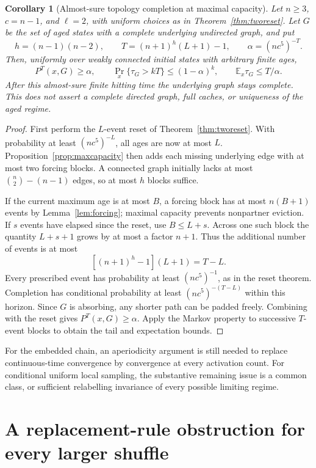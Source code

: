 \documentclass[11pt]{article}
\newtheorem{corollary}[theorem]{Corollary}
\begin{document}
\begin{corollary}[Almost-sure topology completion at maximal capacity]
\label{cor:twocomplete}
Let $n\ge3$, $c=n-1$, and $\ell=2$, with uniform choices as
in Theorem~\ref{thm:tworeset}. Let $G$ be the set of aged
states with a complete underlying undirected graph, and put
\[
 h=(n-1)(n-2),\qquad
 T=(n+1)^h(L+1)-1,\qquad
 \alpha=(nc^5)^{-T}.
\]
Then, uniformly over weakly connected initial states with
arbitrary finite ages,
\[
 P^T(x,G)\ge\alpha,\qquad
 \Pr_x\{\tau_G>kT\}\le(1-\alpha)^k,\qquad
 \mathbb E_x\tau_G\le T/\alpha.
\]
After this almost-sure finite hitting time the underlying
graph stays complete. This does not assert a complete
directed graph, full caches, or uniqueness of the aged regime.
\end{corollary}
\begin{proof}
First perform the $L$-event reset of
Theorem~\ref{thm:tworeset}. With probability at least
$(nc^5)^{-L}$, all ages are now at most $L$.
Proposition~\ref{prop:maxcapacity} then adds each missing
underlying edge with at most two forcing blocks.
A connected graph initially lacks at most
$\binom n2-(n-1)$ edges, so at most $h$ blocks suffice.

If the current maximum age is at most $B$, a forcing block
has at most $n(B+1)$ events by Lemma~\ref{lem:forcing};
maximal capacity prevents nonpartner eviction. If $s$ events
have elapsed since the reset, use $B\le L+s$.
Across one such block the quantity $L+s+1$ grows by at most
a factor $n+1$. Thus the additional number of events is at most
\[
 [(n+1)^h-1](L+1)=T-L.
\]
Every prescribed event has probability at least
$(nc^5)^{-1}$, as in the reset theorem. Completion has
conditional probability at least $(nc^5)^{-(T-L)}$ within
this horizon. Since $G$ is absorbing, any shorter path can
be padded freely. Combining with the reset gives
$P^T(x,G)\ge\alpha$. Apply the Markov property to successive
$T$-event blocks to obtain the tail and expectation bounds.
\end{proof}

For the embedded chain, an aperiodicity argument is still needed
to replace continuous-time convergence by convergence at every
activation count. For conditional uniform local sampling, the
substantive remaining issue is a common class, or sufficient
relabelling invariance of every possible limiting regime.

\section{A replacement-rule obstruction for every larger shuffle}
\label{sec:largerobstruction}
\end{document}
